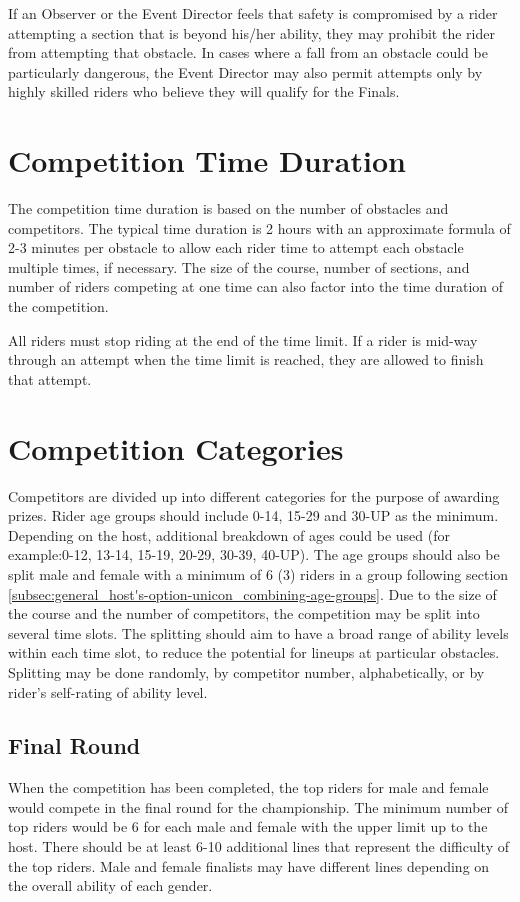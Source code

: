 If an Observer or the Event Director feels that safety is compromised by a rider attempting a section that is beyond his/her
ability, they may prohibit the rider from attempting that obstacle. 
In cases where a fall from an obstacle could be particularly dangerous, the Event Director may also permit attempts only by highly skilled riders who believe they will qualify for the Finals.

\section{Competition Time Duration}
The competition time duration is based on the number of obstacles and competitors. 
The typical time duration is 2 hours with an approximate formula of 2-3 minutes per obstacle to allow each rider time to attempt each obstacle multiple times, if necessary. 
The size of the course, number of sections, and number of riders competing at one time can also factor into the time duration of the competition.

All riders must stop riding at the end of the time limit. 
If a rider is mid-way through an attempt when the time limit is reached, they are allowed to finish that attempt.

\section{Competition Categories}
Competitors are divided up into different categories for the purpose of awarding prizes. 
Rider age groups should include 0-14, 15-29 and 30-UP as the minimum. 
Depending on the host, additional breakdown of ages could be used (for example:0-12, 13-14, 15-19, 20-29, 30-39, 40-UP). 
The age groups should also be split male and female with a minimum of 6 (3) riders in a group following section \ref{subsec:general_host's-option-unicon_combining-age-groups}.
Due to the size of the course and the number of competitors, the competition may be split into several time slots. 
The splitting should aim to have a broad range of ability levels within each time slot, to reduce the potential for lineups at particular obstacles. Splitting may be done randomly, by competitor number, alphabetically, or by rider's self-rating of ability level.

\subsection{Final Round}
When the competition has been completed, the top riders for male and female would compete in the final round for the championship.
The minimum number of top riders would be 6 for each male and female with the upper limit up to the host. 
There should be at least 6-10 additional lines that represent the difficulty of the top riders. 
Male and female finalists may have different lines depending on the overall ability of each gender.

